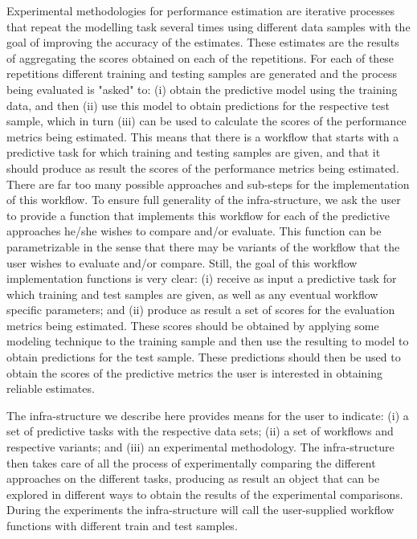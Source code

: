\documentclass[10pt,a4paper]{article}\usepackage[]{graphicx}\usepackage[]{color}
\begin{document}
Experimental methodologies for performance estimation are iterative
processes that repeat the modelling task several times using different
data samples with the goal of improving the accuracy of the
estimates. These estimates are the results of aggregating the scores
obtained on each of the repetitions. For each of these
repetitions different training and testing samples are generated and
the process being evaluated is "asked" to: (i) obtain the predictive
model using the training data, and then (ii) use this model to obtain
predictions for the respective test sample, which in turn (iii) can be
used to calculate the scores of the performance metrics being
estimated. This means that there is a workflow that starts with a
predictive task for which training and testing samples are given, and
that it should produce as result the scores of the performance metrics
being estimated. There are far too many possible approaches and
sub-steps for the implementation of this workflow.  To ensure full
generality of the infra-structure, we ask the user to provide a
function that implements this workflow for each of the predictive
approaches he/she wishes to compare and/or evaluate. This function can
be parametrizable in the sense that there may be variants of the
workflow that the user wishes to evaluate and/or compare. Still, the
goal of this workflow implementation functions is very clear: (i)
receive as input a predictive task for which training  and  test
samples are given, as well as any eventual workflow specific parameters; and
(ii) produce as result a set of scores for the evaluation metrics
being estimated. These scores should be obtained by applying some
modeling technique to the training sample and then use the resulting
to model to obtain predictions for the test sample. These predictions
should then be used to obtain the scores of the predictive metrics the
user is interested in obtaining reliable estimates.

The infra-structure we describe here provides means for the user to
indicate: (i) a set of predictive tasks with the respective data sets;
(ii) a set of workflows and respective variants; and (iii) an
experimental methodology. The infra-structure then takes care of all
the process of experimentally comparing the different approaches on
the different tasks, producing as result an object that can be
explored in different ways to obtain the results of the experimental
comparisons. During the experiments the infra-structure will call the
user-supplied workflow functions with different train and test
samples. 
\end{document}
